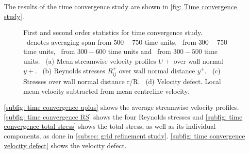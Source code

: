 The results of the time convergence study are shown in \autoref{fig: Time convergence study}.
\begin{figure}
    \centering
    \begin{subfigure}[t]{0.495\textwidth}
        \centering
        \subcaption{}
       
        \label{subfig: time convergence uplus}
    \end{subfigure}
    \hfill
    \begin{subfigure}[t]{0.495\textwidth}
        \centering
        \subcaption{}
       
        \label{subfig: time convergence RS}
    \end{subfigure}
    \plotverticalspacing
    \begin{subfigure}[t]{0.495\textwidth}
        \centering
        \subcaption{}
       
        \label{subfig: time convergence total stress}
    \end{subfigure}
    \hfill
    \begin{subfigure}[t]{0.495\textwidth}
        \centering
        \subcaption{}
       
        \label{subfig: time convergence velocity defect}
    \end{subfigure}
    \plotverticalspacing
    \caption{First and second order statistics for time convergence study. \tfifesevenSymbol \ denotes averaging span from $500-750$ time units, \tthreesevenSymbol \ from $300-750$ time units, \tthreesixSymbol \ from $300-600$ time units and \tthreefiveSymbol \ from $300-500$ time units.~
    (a) Mean streamwise velocity profiles $U+$ over wall normal $y+$.~
    (b) Reynolds stresses $R_{ij}^+$ over wall normal distance $y^+$.~
    (c) Stresses over wall normal distance r/R.~
    (d) Velocity defect. Local mean velocity subtracted from mean centreline velocity.}
    \label{fig: Time convergence study}
\end{figure}
\autoref{subfig: time convergence uplus} shows the average streamwise velocity profiles. \autoref{subfig: time convergence RS} shows the four Reynolds stresses and \autoref{subfig: time convergence total stress} shows the total stress, as well as its individual components, as done in \autoref{subsec: grid refinement study}.  \autoref{subfig: time convergence velocity defect}  shows the velocity defect.
